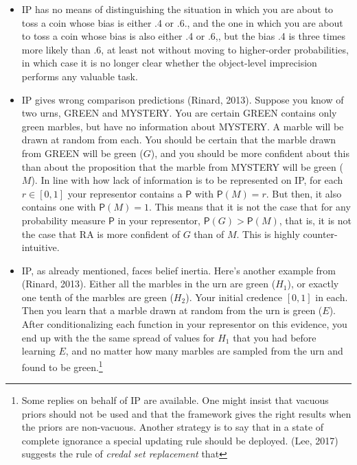 \documentclass[
  10pt,
  dvipsnames,enabledeprecatedfontcommands]{scrartcl}
\newcommand{\pr}[1]{\mathsf{P}(#1)}
\begin{document}
\begin{itemize}
\item
  \textsf{IP} has no means of distinguishing the situation in which you
  are about to toss a coin whose bias is either .4 or .6., and the one
  in which you are about to toss a coin whose bias is also either .4 or
  .6,, but the bias .4 is three times more likely than .6, at least not
  without moving to higher-order probabilities, in which case it is no
  longer clear whether the object-level imprecision performs any
  valuable task.
\item
  \textsf{IP} gives wrong comparison predictions (Rinard, 2013). Suppose
  you know of two urns, \textsf{GREEN} and \textsf{MYSTERY}. You are
  certain \textsf{GREEN} contains only green marbles, but have no
  information about \textsf{MYSTERY}. A marble will be drawn at random
  from each. You should be certain that the marble drawn from
  \textsf{GREEN} will be green (\(G\)), and you should be more confident
  about this than about the proposition that the marble from
  \textsf{MYSTERY} will be green (\(M\)). In line with how lack of
  information is to be represented on \textsf{IP}, for each
  \(r\in [0,1]\) your representor contains a \(\mathsf{P}\) with
  \(\pr{M}=r\). But then, it also contains one with \(\pr{M}=1\). This
  means that it is not the case that for any probability measure
  \(\mathsf{P}\) in your representor, \(\mathsf{P}(G) > \mathsf{P}(M)\),
  that is, it is not the case that RA is more confident of \(G\) than of
  \(M\). This is highly counter-intuitive.
\item
  \textsf{IP}, as already mentioned, faces belief inertia. Here's
  another example from (Rinard, 2013). Either all the marbles in the urn
  are green (\(H_1\)), or exactly one tenth of the marbles are green
  (\(H_2\)). Your initial credence \([0,1]\) in each. Then you learn
  that a marble drawn at random from the urn is green (\(E\)). After
  conditionalizing each function in your representor on this evidence,
  you end up with the the same spread of values for \(H_1\) that you had
  before learning \(E\), and no matter how many marbles are sampled from
  the urn and found to be green.\footnote{Some replies on behalf of IP
    are available. One might insist that vacuous priors should not be
    used and that the framework gives the right results when the priors
    are non-vacuous. Another strategy is to say that in a state of
    complete ignorance a special updating rule should be deployed. (Lee,
    2017) suggests the rule of \emph{credal set replacement} that
}
\end{itemize}
\end{document}
